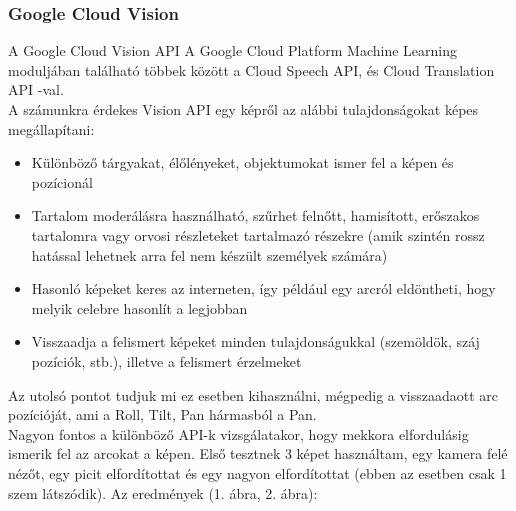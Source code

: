 \subsubsection{Google Cloud Vision}
A Google Cloud Vision API \cite{GoogleCloudVision} A Google Cloud Platform Machine Learning moduljában található többek között a Cloud Speech API, és Cloud Translation API -val.
\\A számunkra érdekes Vision API egy képről az alábbi tulajdonságokat képes megállapítani:
\begin{itemize}
\item Különböző tárgyakat, élőlényeket, objektumokat ismer fel a képen és pozícionál
\item Tartalom moderálásra használható, szűrhet felnőtt, hamisított, erőszakos tartalomra vagy orvosi részleteket tartalmazó részekre (amik szintén rossz hatással lehetnek arra fel nem készült személyek számára)
\item Hasonló képeket keres az interneten, így például egy arcról eldöntheti, hogy melyik celebre hasonlít a legjobban
\item Visszaadja a felismert képeket minden tulajdonságukkal (szemöldök, száj pozíciók, stb.), illetve a felismert érzelmeket
\end{itemize}

Az utolsó pontot tudjuk mi ez esetben kihasználni, mégpedig a visszaadaott arc pozícióját, ami a Roll, Tilt, Pan hármasból a Pan.
\\Nagyon fontos a különböző API-k vizsgálatakor, hogy mekkora elfordulásig ismerik fel az arcokat a képen. Első tesztnek 3 képet használtam, egy kamera felé nézőt, egy picit elfordítottat és egy nagyon elfordítottat (ebben az esetben csak 1 szem látszódik).
Az eredmények (1. ábra, 2. ábra): \\

